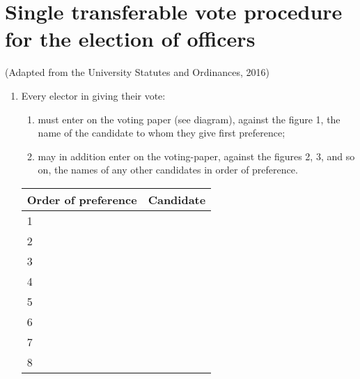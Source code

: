 \documentclass{article}
\begin{document}
\appendix
\section{Single transferable vote procedure for the election of officers}

(Adapted from the University Statutes and Ordinances, 2016)
\begin{enumerate}
\item Every elector in giving their vote:
  \begin{enumerate}
  \item must enter on the voting paper (see diagram), against the figure 1,
  the name of the candidate to whom they give first preference;
  \item may in addition enter on the voting-paper, against the figures 2, 3,
  and so on, the names of any other candidates in order of preference.
  \end{enumerate}

\begin{tabular}{|l|p{10cm}|}
\hline
Order of preference  & Candidate \\ \hline
1                    &           \\ \hline
2                    &           \\ \hline
3                    &           \\ \hline
4                    &           \\ \hline
5                    &           \\ \hline
6                    &           \\ \hline
7                    &           \\ \hline
8                    &           \\ \hline
\end{tabular}



\end{enumerate}
\end{document}
